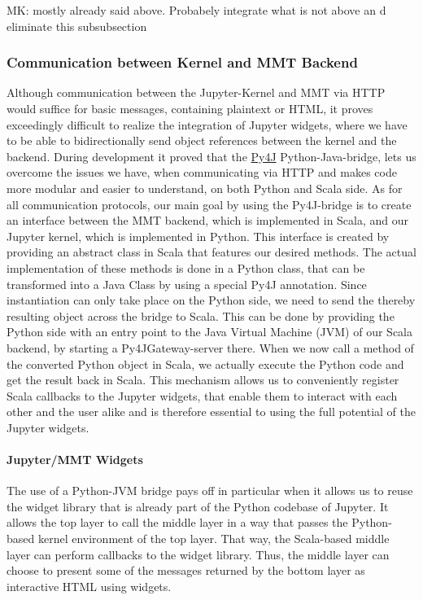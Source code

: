 \begin{oldpart}{MK: mostly already said above. Probabely integrate what is not above an d eliminate this subsubsection}
  \subsubsection{Communication between Kernel and MMT Backend}
Although communication between the Jupyter-Kernel and MMT via HTTP would suffice for basic messages, containing plaintext or HTML, it proves exceedingly difficult to realize the integration of Jupyter widgets, where we have to be able to bidirectionally send object references between the kernel and the backend. During development it proved that the \hyperlink{https://www.py4j.org/}{Py4J} Python-Java-bridge, lets us overcome the issues we have, when communicating via HTTP and makes code more modular and easier to understand, on both Python and Scala side. As for all communication protocols, our main goal by using the Py4J-bridge is to create an interface between the MMT backend, which is implemented in Scala, and our Jupyter kernel, which is implemented in Python. This interface is created by providing an abstract class in Scala that features our desired methods. The actual implementation of these methods is done in a Python class, that can be transformed into a Java Class by using a special Py4J annotation. Since instantiation can only take place on the Python side, we need to send the thereby resulting object across the bridge to Scala. This can be done by providing the Python side with an entry point to the Java Virtual Machine (JVM) of our Scala backend, by starting a Py4JGateway-server there. When we now call a method of the converted Python object in Scala, we actually execute the Python code and get the result back in Scala. This mechanism allows us to conveniently register Scala callbacks to the Jupyter widgets, that enable them to interact with each other and the user alike and is therefore essential to using the full potential of the Jupyter widgets.

\end{oldpart}

\paragraph{Jupyter/MMT Widgets}
The use of a Python-JVM bridge pays off in particular when it allows us to reuse the widget library that is already part of the Python codebase of Jupyter.
It allows the top layer to call the middle layer in a way that passes the Python-based kernel environment of the top layer.
That way, the Scala-based middle layer can perform callbacks to the widget library.
Thus, the middle layer can choose to present some of the messages returned by the bottom layer as interactive HTML using widgets.

